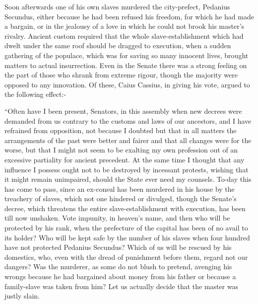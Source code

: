
Soon afterwards one of his own slaves murdered the city-prefect, Pedanius Secundus, either because he had been refused his freedom, for which he had made a bargain, or in the jealousy of a love in which he could not brook his master's rivalry. Ancient custom required that the whole slave-establishment which had dwelt under the same roof should be dragged to execution, when a sudden gathering of the populace, which was for saving so many innocent lives, brought matters to actual insurrection. Even in the Senate there was a strong feeling on the part of those who shrank from extreme rigour, though the majority were opposed to any innovation. Of these, Caius Cassius, in giving his vote, argued to the following effect:-


``Often have I been present, Senators, in this assembly when new decrees were demanded from us contrary to the customs and laws of our ancestors, and I have refrained from opposition, not because I doubted but that in all matters the arrangements of the past were better and fairer and that all changes were for the worse, but that I might not seem to be exalting my own profession out of an excessive partiality for ancient precedent. At the same time I thought that any influence I possess ought not to be destroyed by incessant protests, wishing that it might remain unimpaired, should the State ever need my counsels. To-day this has come to pass, since an ex-consul has been murdered in his house by the treachery of slaves, which not one hindered or divulged, though the Senate's decree, which threatens the entire slave-establishment with execution, has been till now unshaken. Vote impunity, in heaven's name, and then who will be protected by his rank, when the prefecture of the capital has been of no avail to its holder? Who will be kept safe by the number of his slaves when four hundred have not protected Pedanius Secundus? Which of us will be rescued by his domestics, who, even with the dread of punishment before them, regard not our dangers? Was the murderer, as some do not blush to pretend, avenging his wrongs because he had bargained about money from his father or because a family-slave was taken from him? Let us actually decide that the master was justly slain.


